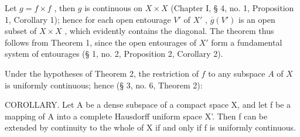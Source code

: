 Let \(g = f \times f\) , then \(g\) is continuous on \(X \times X\) (Chapter I, § 4, no. 1, Proposition 1, Corollary 1); hence for each open entourage \(V'\) of \(X'\) , \(\overline{g}(V')\) is an open subset of \(X \times X\) , which evidently contains the diagonal. The theorem thus follows from Theorem 1, since the open entourages of \(X'\) form a fundamental system of entourages (§ 1, no. 2, Proposition 2, Corollary 2).

Under the hypotheses of Theorem 2, the restriction of \(f\) to any subspace \(A\) of \(X\) is uniformly continuous; hence (§ 3, no. 6, Theorem 2):

COROLLARY. Let A be a dense subspace of a compact space X, and let f be a mapping of A into a complete Hausdorff uniform space X'. Then f can be extended by continuity to the whole of X if and only if f is uniformly continuous.

